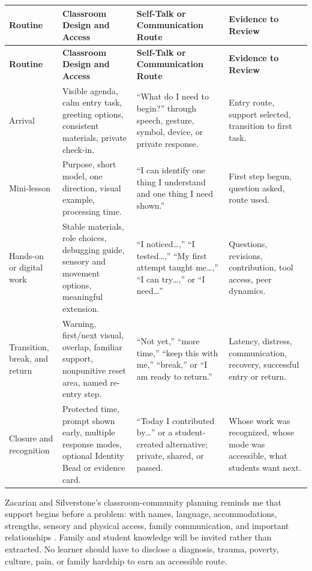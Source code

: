 \documentclass[11pt]{article}
\begin{document}
\begin{longtable}{>{\RaggedRight\arraybackslash}p{0.75in} >{\RaggedRight\arraybackslash}p{2.20in} >{\RaggedRight\arraybackslash}p{2.05in} >{\RaggedRight\arraybackslash}p{1.74in}}
\rowcolor{PrimaryRed}
\color{white}\bfseries Routine &
\color{white}\bfseries Classroom Design and Access &
\color{white}\bfseries Self-Talk or Communication Route &
\color{white}\bfseries Evidence to Review \\
\endfirsthead
\rowcolor{PrimaryRed}
\color{white}\bfseries Routine &
\color{white}\bfseries Classroom Design and Access &
\color{white}\bfseries Self-Talk or Communication Route &
\color{white}\bfseries Evidence to Review \\
\endhead
Arrival &
Visible agenda, calm entry task, greeting options, consistent materials, private check-in. &
``What do I need to begin?'' through speech, gesture, symbol, device, or private response. &
Entry route, support selected, transition to first task. \\
\rowcolor{SoftGray}
Mini-lesson &
Purpose, short model, one direction, visual example, processing time. &
``I can identify one thing I understand and one thing I need shown.'' &
First step begun, question asked, route used. \\
Hands-on or digital work &
Stable materials, role choices, debugging guide, sensory and movement options, meaningful extension. &
``I noticed\ldots,'' ``I tested\ldots,'' ``My first attempt taught me\ldots,'' ``I can try\ldots,'' or ``I need\ldots'' &
Questions, revisions, contribution, tool access, peer dynamics. \\
\rowcolor{SoftGray}
Transition, break, and return &
Warning, first/next visual, overlap, familiar support, nonpunitive reset area, named re-entry step. &
``Not yet,'' ``more time,'' ``keep this with me,'' ``break,'' or ``I am ready to return.'' &
Latency, distress, communication, recovery, successful entry or return. \\
Closure and recognition &
Protected time, prompt shown early, multiple response modes, optional Identity Bead or evidence card. &
``Today I contributed by\ldots'' or a student-created alternative; private, shared, or passed. &
Whose work was recognized, whose mode was accessible, what students want next. \\
\end{longtable}
\normalsize

Zacarian and Silverstone's classroom-community planning reminds me that support begins before a problem: with names, language, accommodations, strengths, sensory and physical access, family communication, and important relationships \citep{zacarian2015community}. Family and student knowledge will be invited rather than extracted. No learner should have to disclose a diagnosis, trauma, poverty, culture, pain, or family hardship to earn an accessible route.
\end{document}
